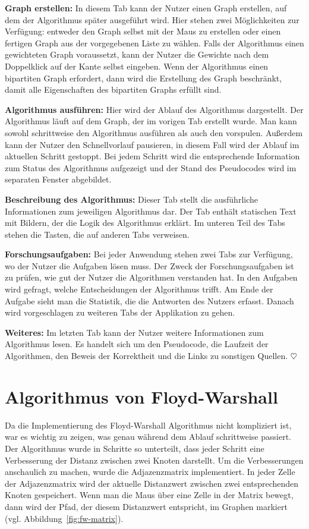 \noindent\textbf{Graph erstellen:} In diesem Tab kann der Nutzer einen Graph erstellen, auf dem der Algorithmus später ausgeführt wird. Hier stehen zwei Möglichkeiten zur Verfügung: entweder den Graph selbst mit der Maus zu erstellen oder einen fertigen Graph aus der vorgegebenen Liste zu wählen. Falls der Algorithmus einen gewichteten Graph voraussetzt, kann der Nutzer die Gewichte nach dem Doppelklick auf der Kante selbst eingeben. Wenn der Algorithmus einen bipartiten Graph erfordert, dann wird die Erstellung des Graph beschränkt, damit alle Eigenschaften des bipartiten Graphs erfüllt sind. 

\noindent\textbf{Algorithmus ausführen:} Hier wird der Ablauf des Algorithmus dargestellt. Der Algorithmus läuft auf dem Graph, der im vorigen Tab erstellt wurde. Man kann sowohl schrittweise den Algorithmus ausführen als auch den vorspulen. Außerdem kann der Nutzer den Schnellvorlauf pausieren, in diesem Fall wird der Ablauf im aktuellen Schritt gestoppt. Bei jedem Schritt wird die entsprechende Information zum Status des Algorithmus aufgezeigt und der Stand des Pseudocodes wird im separaten Fenster abgebildet.

\noindent\textbf{Beschreibung des Algorithmus:} Dieser Tab stellt die ausführliche Informationen zum jeweiligen Algorithmus dar. Der Tab enthält statischen Text mit Bildern, der die Logik des Algorithmus erklärt. Im unteren Teil des Tabs stehen die Tasten, die auf anderen Tabs verweisen.

\noindent\textbf{Forschungsaufgaben:} Bei jeder Anwendung stehen zwei Tabs zur Verfügung, wo der Nutzer die Aufgaben lösen muss. Der Zweck der Forschungsaufgaben ist zu prüfen, wie gut der Nutzer die Algorithmen verstanden hat. In den Aufgaben wird gefragt, welche Entscheidungen der Algorithmus trifft. Am Ende der Aufgabe sieht man die Statistik, die die Antworten des Nutzers erfasst. Danach wird vorgeschlagen zu weiteren Tabs der Applikation zu gehen.

\noindent\textbf{Weiteres:} Im letzten Tab kann der Nutzer weitere Informationen zum Algorithmus lesen. Es handelt sich um den Pseudocode, die Laufzeit der Algorithmen, den Beweis der Korrektheit und die Links zu sonstigen Quellen. \hfill$\heartsuit$

\section{Algorithmus von Floyd-Warshall} %
Da die Implementierung des Floyd-Warshall Algorithmus nicht kompliziert ist, war es wichtig zu zeigen, was genau während dem Ablauf schrittweise passiert. Der Algorithmus wurde in Schritte so unterteilt, dass jeder Schritt eine Verbesserung der Distanz zwischen zwei Knoten darstellt. Um die Verbesserungen anschaulich zu machen, wurde die Adjazenzmatrix implementiert. In jeder Zelle der Adjazenzmatrix wird der aktuelle Distanzwert zwischen zwei entsprechenden Knoten gespeichert. Wenn man die Maus über eine Zelle in der Matrix bewegt, dann wird der Pfad, der diesem Distanzwert entspricht, im Graphen markiert (vgl. Abbildung~\ref{fig:fw-matrix}).

